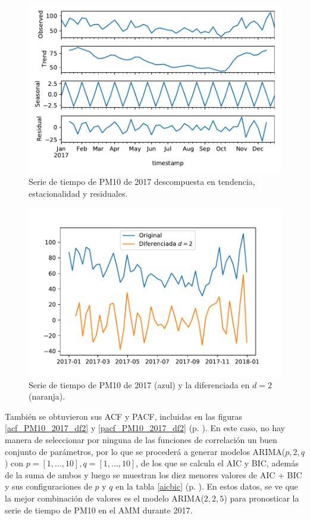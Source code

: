 \documentclass{elsarticle}
\begin{document}
\begin{figure}
\centering
	\includegraphics[width=1\textwidth]{decompose_PM10_2017.pdf}
	\caption{Serie de tiempo de PM10 de 2017 descompuesta en tendencia, estacionalidad y residuales.}
	\label{decompose_PM10_2017}
\end{figure}

\begin{figure}
\centering
	\includegraphics[width=1\textwidth]{df_PM10_diff2.pdf}
	\caption{Serie de tiempo de PM10 de 2017 (azul) y la diferenciada en $d = 2$ (naranja).}
	\label{df_PM10_diff2}
\end{figure}

También se obtuvieron sus ACF y PACF, incluidas en las figuras \ref{acf_PM10_2017_df2} y \ref{pacf_PM10_2017_df2} (p. \pageref{pacf_PM10_2017_df2}). En este caso, no hay manera de seleccionar por ninguna de las funciones de correlación un buen conjunto de parámetros, por lo que se procederá a generar modelos ARIMA($p, 2, q$) con $p = [1, \ldots, 10], q = [1, \ldots, 10]$, de los que se calcula el AIC y BIC, además de la suma de ambos y luego se muestran los diez menores valores de AIC $+$ BIC y sus configuraciones de $p$ y $q$ en la tabla \ref{aicbic} (p. \pageref{aicbic}). En estos datos, se ve que la mejor combinación de valores es el modelo ARIMA($2, 2, 5$) para pronosticar la serie de tiempo de PM10 en el AMM durante 2017.
\end{document}
